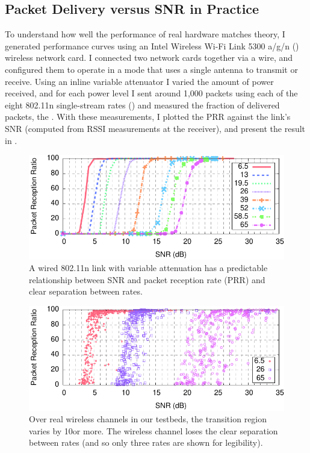 \subsection{Packet Delivery versus SNR in Practice}
To understand how well the performance of real hardware matches theory, I generated performance curves using an Intel Wireless Wi-Fi Link 5300 a/g/n () wireless network card. I connected two network cards together via a wire, and configured them to operate in a mode that uses a single antenna to transmit or receive. Using an inline variable attenuator I varied the amount of power received, and for each power level I sent around 1,000 packets using each of the eight 802.11n single-stream rates () and measured the fraction of delivered packets, the . With these measurements, I plotted the PRR against the link's SNR (computed from RSSI measurements at the receiver), and present the result in . 

\begin{figure}[t!]
	\centering
	\includegraphics[width=\textwidth]{figures/snr_prr_atten.pdf}
	\caption{\label{fig:snr_prr_attenuator}A wired 802.11n link with variable attenuation has a predictable relationship between SNR and packet reception rate (PRR) and clear separation between rates.}
\end{figure}
\begin{figure}[t!]
	\centering
	\includegraphics[width=\textwidth]{figures/snr_prr_scatter.pdf}
	\caption{\label{fig:snr_prr_26_65} Over real wireless channels in our testbeds, the transition region varies by 10\dB or more. The wireless channel loses the clear separation between rates (and so only three rates are shown for legibility).}%
\end{figure}

